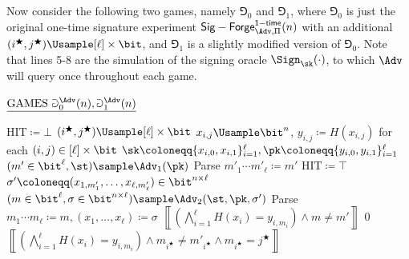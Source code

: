 \begin{answer}
    Now consider the following two games, namely $\Game_0$ and $\Game_1$, where $\Game_0$ is just the original one-time signature experiment $\mathsf{Sig-Forge}^{\mathsf{1-time}}_{\Adv, \Pi}(n)$ with an additional $(i^\bigstar, j^\bigstar)\Usample [\ell]\times \bit$, and $\Game_1$ is a slightly modified version of $\Game_0$. Note that lines 5-8 are the simulation of the signing oracle $\Sign_\sk(\cdot)$, to which $\Adv$ will query once throughout each game. 
    \begin{simplebox}
        \small
        \noindent
        $\underline{\textrm{GAMES } \Game_0^\Adv(n), \Game_1^\Adv(n)}$
        \begin{algorithmic}[1]
            \color{red}
            \State $\textrm{HIT} \coloneqq \bot$ 
            \color{Magenta}
            \State $(i^\bigstar, j^\bigstar)\Usample [\ell]\times \bit$
            \color{black}
            \State $x_{i,j} \Usample \bit^n$, $y_{i,j}\coloneqq H(x_{i, j})$ for each $(i,j)\in [\ell]\times \bit$
            \State $\sk \coloneqq \{x_{i,0}, x_{i, 1}\}_{i=1}^\ell, \pk \coloneqq \{y_{i,0}, y_{i, 1}\}_{i=1}^\ell$
            \State $(m' \in \bit^\ell, \st) \sample \Adv_1(\pk)$
            \State Parse $m'_1\cdots m'_\ell \coloneqq m'$
            \color{red}
             
            \State $\textrm{HIT} \coloneqq \top$  
            \EndIf
            \color{black}
            \State $\sigma' \coloneqq (x_{1, m'_1}, \ldots, x_{\ell, m'_\ell})\in \bit^{n\times \ell}$
            \State $(m\in \bit^\ell,\sigma\in \bit^{n\times \ell})\sample \Adv_2(\st, \pk, \sigma')$
            \State Parse $m_1\cdots m_\ell\coloneqq m,  (x_1,\ldots, x_\ell)\coloneqq \sigma$
            \color{blue}
            \State\Return $\left\llbracket \left( \bigwedge_{i=1}^\ell H(x_i)=y_{i, m_i} \right) \land m\neq m' \right\rrbracket$ 
            \color{red}
             
            \State\Return $0$ 
            \Else {}
            \State\Return $\left\llbracket \left( \bigwedge_{i=1}^\ell H(x_i)=y_{i, m_i} \right) \land m_{i^\bigstar}\neq m'_{i^\bigstar} \land  m_{i^\bigstar} = j^\bigstar \right\rrbracket$ 
            \EndIf
        \end{algorithmic}
    \end{simplebox}
    

\end{answer}
